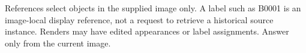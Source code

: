 References select objects in the supplied image only. A label such as B0001 is an image-local display reference, not a request to retrieve a historical source instance. Renders may have edited appearances or label assignments. Answer only from the current image.
